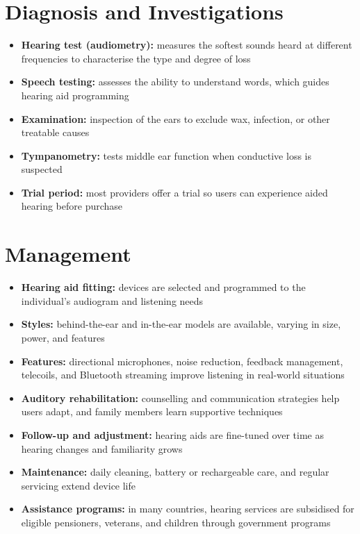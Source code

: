 \section*{Diagnosis and Investigations}
\begin{itemize}
    \item \textbf{Hearing test (audiometry):} measures the softest sounds heard at different frequencies to characterise the type and degree of loss
    \item \textbf{Speech testing:} assesses the ability to understand words, which guides hearing aid programming
    \item \textbf{Examination:} inspection of the ears to exclude wax, infection, or other treatable causes
    \item \textbf{Tympanometry:} tests middle ear function when conductive loss is suspected
    \item \textbf{Trial period:} most providers offer a trial so users can experience aided hearing before purchase
\end{itemize}

\section*{Management}
\begin{itemize}
    \item \textbf{Hearing aid fitting:} devices are selected and programmed to the individual's audiogram and listening needs
    \item \textbf{Styles:} behind-the-ear and in-the-ear models are available, varying in size, power, and features
    \item \textbf{Features:} directional microphones, noise reduction, feedback management, telecoils, and Bluetooth streaming improve listening in real-world situations
    \item \textbf{Auditory rehabilitation:} counselling and communication strategies help users adapt, and family members learn supportive techniques
    \item \textbf{Follow-up and adjustment:} hearing aids are fine-tuned over time as hearing changes and familiarity grows
    \item \textbf{Maintenance:} daily cleaning, battery or rechargeable care, and regular servicing extend device life
    \item \textbf{Assistance programs:} in many countries, hearing services are subsidised for eligible pensioners, veterans, and children through government programs
\end{itemize}

